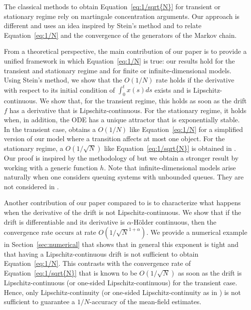 \documentclass[sigconf]{acmart}
\begin{document}
The classical methods to obtain Equation~\eqref{eq:1/sqrt{N}} for
transient \cite{benaim2008class,kurtz70} or stationary regime
\cite{bortolussi2013bounds} rely on martingale concentration
arguments.  Our approach is different and uses an idea inspired by
Stein's method and
\cite{kolokoltsov2011mean,stein1986approximate,ying2016rate} to relate
Equation~\eqref{eq:1/N} and the convergence of the generators of the
Markov chain.  

From a theoretical perspective, the main contribution of our paper is
to provide a unified framework in which Equation~\eqref{eq:1/N} is
true: our results hold for the transient and stationary regime and for
finite or infinite-dimensional models.  Using Stein's method, we show
that the $O(1/N)$ rate holds if the derivative with respect to its
initial condition of $\int_0^tx(s)ds$ exists and is
Lipschitz-continuous.  We show that, for the transient regime, this
holds as soon as the drift $f$ has a derivative that is
Lipschitz-continuous. For the stationary regime, it holds when, in
addition, the ODE has a unique attractor that is exponentially stable.
In the transient case, \cite{kolokoltsov2011mean} obtains a $O(1/N)$
like Equation~\eqref{eq:1/N} for a simplified version of our model
where a transition affects at most one object.  For the stationary
regime, a $O(1/\sqrt{N})$ like Equation~\eqref{eq:1/sqrt{N}} is
obtained in \cite{ying2016rate}. Our proof is inspired by the
methodology of \cite{ying2016rate} but we obtain a stronger result by
working with a generic function $h$.  Note that infinite-dimensional
models arise naturally when one considers queuing systems with
unbounded queues. They are not considered in
\cite{kolokoltsov2011mean,ying2016rate}.

Another contribution of our paper compared to
\cite{kolokoltsov2011mean,ying2016rate} is to characterize what
happens when the derivative of the drift is not
Lipschitz-continuous.  We show that if the drift is differentiable and
its derivative is $\alpha$-Hölder continuous, then the convergence
rate occurs at rate $O(1/\sqrt{N}^{1+\alpha})$.  We provide a
numerical example in Section~\ref{sec:numerical} that shows that in
general this exponent is tight and that having a Lipschitz-continuous
drift is not sufficient to obtain Equation~\eqref{eq:1/N}. This
contrasts with the convergence rate of Equation~\eqref{eq:1/sqrt{N}}
that is known to be $O(1/\sqrt{N})$ as soon as the drift is
Lipschitz-continuous (or one-sided Lipschitz-continuous) for the
transient case.  Hence, only Lipschitz-continuity (or one-sided
Lipschitz-continuity as in \cite{gast2012markov,tsitsiklis2011power})
is not sufficient to guarantee a $1/N$-accuracy of the mean-field
estimates.
\end{document}

